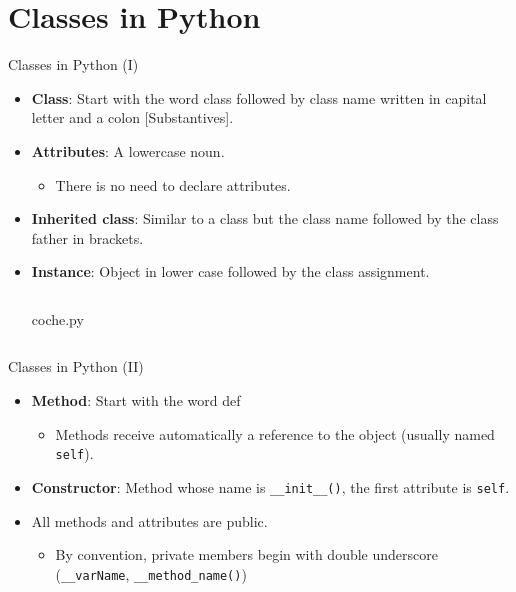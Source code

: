 \documentclass[10pt,compress]{beamer} %
\begin{document}
\section{Classes in Python}

\begin{frame}{Classes in Python (I)}
\vspace{-0.2cm}
\begin{itemize}			
		\item \small{\textbf{Class}: Start with the word \alert{class} followed by class name written in \alert{capital letter} and a colon [Substantives].}
		\item \small{\textbf{Attributes}: A lowercase noun.}
		\begin{itemize}
		\item \footnotesize{There is no need to declare attributes.}
		\end{itemize}
		
		\item \small{\textbf{Inherited class}: Similar to a class but the class name followed by the class father in brackets.}
		\item \small{\textbf{Instance}: Object in lower case followed by the class assignment.}
			\vspace{-0.2cm} 
  	   \begin{columns}
			\begin{block}{\small{coche.py}}
			\vspace{-0.3cm} 
				\vspace{-0.2cm} 
			\end{block}
	\end{columns}		
\end{itemize}			
\end{frame}

\begin{frame}{Classes in Python (II)}
\begin{itemize}
	\item \textbf{Method}: Start with the word \alert{def}
   \begin{itemize}
   \item Methods receive automatically a reference to the object (usually named \texttt{self}).
   \end{itemize}
		\item \textbf{Constructor}: Method whose name is \texttt{\_\_init\_\_()}, the first attribute is \texttt{self}.

		\item All methods and attributes are public.
			\begin{itemize}
				\item By convention, private members begin with double underscore (\texttt{\_\_varName}, \texttt{\_\_method\_name()})
			\end{itemize}
\end{itemize}			
\end{frame}
\end{document}
